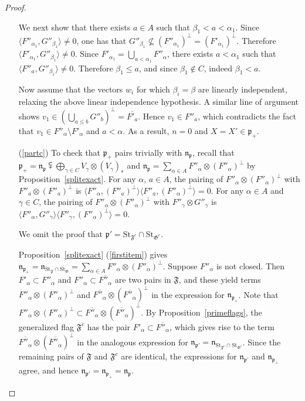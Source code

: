 \documentclass{article}
\newcommand {\St} {\mathrm{St}}
\def\n{\mathfrak {n}}
\def\p{\mathfrak {p}}
\def\F{\mathfrak{F}}
\def\G{\mathfrak{G}}
\begin{document}
\begin{proof}
\begin{itemize}
We next show that there exists $a \in A$ such that $\beta_1 < a < \alpha_1$.  Since $\langle F''_{\alpha_1} , G''_{\beta_1} \rangle \neq 0$, one has that $G''_{\beta_1} \nsubseteq (F''_{\alpha_1})^\perp = (F'_{\alpha_1})^\perp$.  Therefore $\langle F'_{\alpha_1} , G''_{\beta_1} \rangle \neq 0$.  Since $F'_{\alpha_1} = \bigcup_{a < {\alpha_1}} F''_\alpha$, there exists $a < {\alpha_1}$ such that $\langle F''_a , G''_{\beta_1} \rangle \neq 0$.  Therefore $\beta_1 \leq a$, and since $\beta_1 \notin C$, indeed $\beta_1 < a$.

Now assume that the vectors $w_i$ for which $\beta_i = \beta$ are linearly independent, relaxing the above linear independence hypothesis.  
A similar line of argument shows $v_1 \in (\bigcup_{a \leq b} G''_b)^\perp = \overline{F'_a}$.  Hence $v_1 \in F''_a$, which contradicts the fact that $v_1 \in F''_\alpha \setminus F'_\alpha$ and $a < \alpha$.  As a result, $n = 0$ and $X = X' \in \p_+$.

\item[(\ref{partc})] 
To check that $\p_+$ pairs trivially with $\n_\p$, recall that $\p_+ = \n_\p \subsetplus \bigoplus_{\gamma \in C} V_\gamma \otimes (V_\gamma)_*$ and $\n_\p = \sum_{\alpha \in A} F''_\alpha \otimes (F''_\alpha)^\perp$ by Proposition~\ref{splitexact}.  For any $\alpha$, $a \in A$, the pairing of $F''_\alpha \otimes (F''_\alpha)^\perp$ with $F''_a \otimes (F''_a)^\perp$ is $\langle F''_\alpha , (F''_a)^\perp \rangle \langle F''_a , (F''_\alpha)^\perp \rangle = 0$.  For any $\alpha \in A$ and $\gamma \in C$,  the pairing of $F''_\alpha \otimes (F''_\alpha)^\perp$ with $F''_\gamma \otimes G''_\gamma$ is $\langle F''_\alpha , G''_\gamma \rangle \langle F''_\gamma , (F''_\alpha)^\perp \rangle = 0$.

We omit the proof that $\p' = \St_{\F^c} \cap \St_{\G^c}$.

Proposition~\ref{splitexact} (\ref{firstitem}) gives $\n_{\p_+} = \n_{\St_\F \cap \St_\G} = \sum_{\alpha \in A} F''_\alpha \otimes (F''_\alpha)^\perp$.  
Suppose $F''_\alpha$ is not closed.  Then $F'_\alpha \subset F''_\alpha$ and $F''_\alpha \subset \overline{F''_\alpha}$ are two pairs in $\F$, and these yield terms $F''_\alpha \otimes (F''_\alpha)^\perp$ and $\overline{F''_\alpha} \otimes ( \overline{F''_\alpha} )^\perp$ in the expression for $\n_{\p_+} $.  Note that $F''_\alpha \otimes (F''_\alpha)^\perp \subset \overline{F''_\alpha} \otimes ( \overline{F''_\alpha} )^\perp$.
By Proposition~\ref{primeflags}, the generalized flag $\F^c$ has the pair $F'_\alpha \subset \overline{F''_\alpha}$, which gives rise to the term $\overline{F''_\alpha} \otimes (\overline{F''_\alpha})^\perp$ in the analogous expression for $\n_{\p'} = \n_{\St_{\F^c} \cap \St_{\G^c}}$.  Since the remaining pairs of $\F$ and $\F^c$ are identical, the expressions for  $\n_{\p'}$ and $\n_{\p_+}$ agree, and hence $\n_{\p'} = \n_{\p_+} = \n_\p$.
\end{itemize}


\end{proof}
\end{document}
